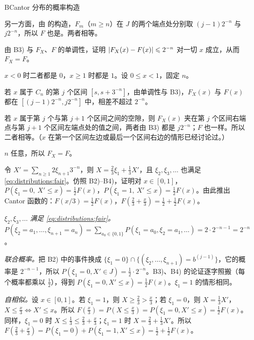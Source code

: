 \begin{probleme}{B}{Cantor 分布的概率构造}
\begin{questions}
\begin{solution}
另一方面，由 的构造，$F_m$（$m\geqslant n$）在 $J$ 的两个端点处分别取 $(j-1)2^{-n}$ 与 $j2^{-n}$，所以 $F$ 也是。两者相等。
\end{solution}
\item 由 B3) 与 $F_X$、$F$ 的单调性，证明 $\lvert F_X(x)-F(x)\rvert\leqslant2^{-n}$ 对一切 $x$ 成立，从而 $F_X=F$。
\begin{solution}
$x<0$ 时二者都是 $0$，$x\geqslant1$ 时都是 $1$。设 $0\leqslant x<1$，固定 $n$。

若 $x$ 属于 $C_n$ 的第 $j$ 个区间 $[s,s+3^{-n}]$，由单调性与 B3)，$F_X(x)$ 与 $F(x)$ 都在 $[(j-1)2^{-n},j2^{-n}]$ 中，相差不超过 $2^{-n}$。

若 $x$ 属于第 $j$ 个与第 $j+1$ 个区间之间的空隙，则 $F_X(x)$ 夹在第 $j$ 个区间右端点与第 $j+1$ 个区间左端点处的值之间，两者由 B3) 都是 $j2^{-n}$；$F$ 也一样。所以二者相等。（$x$ 在第一个区间左边或最后一个区间右边的情形已经讨论过。）

$n$ 任意，所以 $F_X=F$。
\end{solution}
\item 令 $X'=\sum_{n\geqslant1}2\xi_{n+1}3^{-n}$，则 $X=\frac23\xi_1+\frac13X'$，且 $\xi_2,\xi_3,\dots$ 也满足 \eqref{eq:distributions:fair}。仿照 B2)--B4)，证明对 $x\in[0,1]$，$P(\xi_1=0,\ X'\leqslant x)=\frac12F(x)$，$P(\xi_1=1,\ X'\leqslant x)=\frac12F(x)$。由此推出 Cantor 函数的：$F(x/3)=\frac12F(x)$，$F(\frac23+\frac x3)=\frac12+\frac12F(x)$。
\begin{solution}
\emph{$\xi_2,\xi_3,\dots$ 满足 \eqref{eq:distributions:fair}。}$P(\xi_2=a_1,\dots,\xi_{n+1}=a_n)=\sum_{a_0\in\{0,1\}}P(\xi_1=a_0,\xi_2=a_1,\dots)=2\cdot2^{-n-1}=2^{-n}$。

\emph{联合概率。}把 B2) 中的事件换成 $\{\xi_1=0\}\cap\{(\xi_2,\dots,\xi_{n+1})=b^{(j-1)}\}$，它的概率是 $2^{-n-1}$，所以 $P(\xi_1=0,X'\in J)=\frac12\cdot2^{-n}$。B3)、B4) 的论证逐字照搬（每个概率都乘以 $\frac12$），得到 $P(\xi_1=0,X'\leqslant x)=\frac12F(x)$。$\xi_1=1$ 的情形相同。

\emph{自相似。}设 $x\in[0,1]$。若 $\xi_1=1$，则 $X\geqslant\frac23>\frac x3$；若 $\xi_1=0$，则 $X=\frac13X'$，$X\leqslant\frac x3\iff X'\leqslant x$。所以 $F(\frac x3)=P(X\leqslant\frac x3)=P(\xi_1=0,X'\leqslant x)=\frac12F(x)$。同样，$\xi_1=0$ 时 $X\leqslant\frac13\leqslant\frac23+\frac x3$；$\xi_1=1$ 时 $X=\frac23+\frac13X'$。所以 $F(\frac23+\frac x3)=P(\xi_1=0)+P(\xi_1=1,X'\leqslant x)=\frac12+\frac12F(x)$。


\end{solution}
\end{questions}
\end{probleme}
